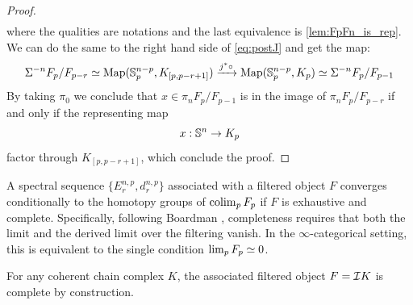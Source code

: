 \begin{proof}
\begin{align*}
    \end{align*}
    where the qualities are notations and the last equivalence is \cref{lem:FpFn_is_rep}. We can do the same to the right hand side of \cref{eq:postJ} and get the map:
    \begin{equation}\label{eq:postJ_RHS}
        \Sigma^{-n} F_p/F_{p-r} \simeq \operatorname{Map}(\mathbb{S}^{n-p}_p, K_{[p,p-r+1]}) \xrightarrow{j^*\circ }
        \operatorname{Map}(\mathbb{S}^{n-p}_p, K_p) \simeq \Sigma^{-n} F_p/F_{p-1}
    \end{equation}
    By taking $\pi_0$ we conclude that $x \in  \pi_n F_p/F_{p-1}$ is in the image of $\pi_n F_p/F_{p-r}$ if and only if the representing map
    \begin{equation*}
        x : \mathbb{S}^n \to K_p
    \end{equation*}
    factor through $K_{[p,p-r+1]}$, which conclude the proof.
\end{proof}

\begin{defn}\label{def:cond_conv}
    A spectral sequence $\{ E_r^{n,p}, d_r^{n,p} \}$ associated with a filtered object $F$ converges conditionally to the homotopy groups of $\operatorname*{colim}_p F_p$ if $F$ is exhaustive and complete. Specifically, following Boardman \cite[Def.\ 5.10]{Boa99}, completeness requires that both the limit and the derived limit over the filtering vanish. In the $\infty$-categorical setting, this is equivalent to the single condition $\lim_p F_p \simeq 0$.
\end{defn}

\begin{rem}
    For any coherent chain complex $K$, the associated filtered object $F = \mathcal{I} K$ is complete by construction.
\end{rem}


